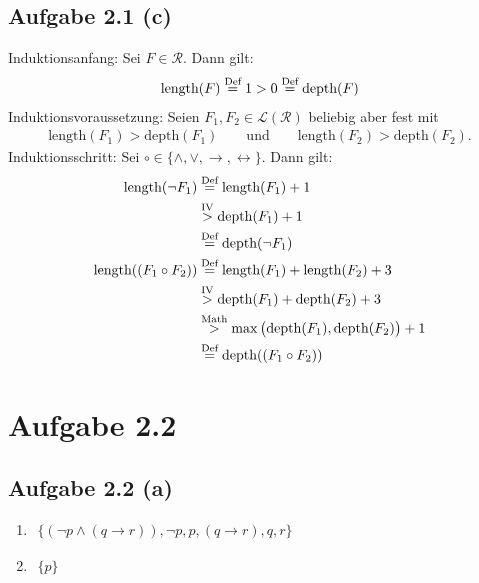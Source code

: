 \documentclass[12pt,a4paper]{article}
\newcommand{\depth}{\text{depth}}
\newcommand{\length}{\text{length}}
\begin{document}
\subsection*{Aufgabe 2.1 (c)}
Induktionsanfang: Sei $F\in\mathcal{R}$. Dann gilt:
\begin{align*}
\length(F)\stackeq{\text{Def}}1>0\stackeq{\text{Def}}\depth(F)
\end{align*}
Induktionsvoraussetzung: Seien $F_1,F_2\in\mathcal{L}(\mathcal{R})$ beliebig aber fest mit
\begin{align*}
\length(F_1)>\depth(F_1)\qquad\text{und}\qquad\length(F_2)>\depth(F_2).
\end{align*}
Induktionsschritt: Sei $\circ\in\lbrace\wedge,\vee,\to,\leftrightarrow\rbrace$. Dann gilt:
\begin{align*}
\length(\neg F_1)
&\stackeq{\text{Def}}
\length(F_1)+1\\
&\stackrel{\text{IV}}{>}
\depth(F_1)+1\\
&\stackeq{\text{Def}}
\depth(\neg F_1)\\
\length((F_1\circ F_2))
&\stackeq{\text{Def}}
\length(F_1)+\length(F_2)+3\\
&\stackrel{\text{IV}}{>}
\depth(F_1)+\depth(F_2)+3\\
&\stackrel{\text{Math}}{>}
\max\big(\depth(F_1),\depth(F_2)\big)+1\\
&\stackeq{\text{Def}}
\depth((F_1\circ F_2))
\end{align*}

\section*{Aufgabe 2.2}
\subsection*{Aufgabe 2.2 (a)}
\begin{enumerate}[label=(\arabic*)]
\item $\begin{aligned}
\big\lbrace (\neg p\wedge(q\to r)),\neg p, p, (q\to r),q,r\big\rbrace
\end{aligned}$
\item $\begin{aligned}
\big\lbrace p\big\rbrace
\end{aligned}$
\end{enumerate}
\end{document}
